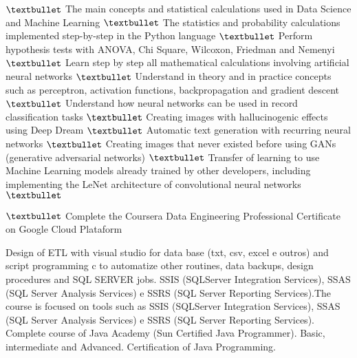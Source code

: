 \documentclass[
	a4paper,
]{fortysecondscv}
\begin{document}
\begin{cvtable}[1.5]
		{$\textbullet$ The main concepts and statistical calculations used in Data Science and Machine Learning
		$\textbullet$ The statistics and probability calculations implemented step-by-step in the Python language
		$\textbullet$ Perform hypothesis tests with ANOVA, Chi Square, Wilcoxon, Friedman and Nemenyi
		}
		{$\textbullet$ Learn step by step all mathematical calculations involving artificial neural networks
		$\textbullet$ Understand in theory and in practice concepts such as perceptron, activation functions, backpropagation and gradient descent
		$\textbullet$ Understand how neural networks can be used in record classification tasks
		}
		{$\textbullet$ Creating images with hallucinogenic effects using Deep Dream
		$\textbullet$ Automatic text generation with recurring neural networks
		$\textbullet$ Creating images that never existed before using GANs (generative adversarial networks)
		$\textbullet$ Transfer of learning to use Machine Learning models already trained by other developers, including implementing the LeNet architecture of convolutional neural networks
		$\textbullet$}

		{$\textbullet$ Complete the Coursera Data Engineering Professional Certificate on Google Cloud Plataform}
\end{cvtable}


\begin{cvtable}[1.5]
	{Design of ETL with visual studio for data base (txt, csv, excel e outros) and script programming c to automatize other routines, data backups, design procedures and SQL SERVER jobs.
	SSIS (SQLServer Integration Services), SSAS (SQL Server Analysis Services) e SSRS (SQL Server Reporting Services).The course is focused on tools such as SSIS (SQLServer Integration Services), SSAS (SQL Server Analysis Services) e SSRS (SQL Server Reporting Services).}
	{Complete course of Java Academy (Sun Certified Java Programmer). Basic, intermediate and Advanced. Certification of Java Programming.}	
\end{cvtable}

\end{document}
